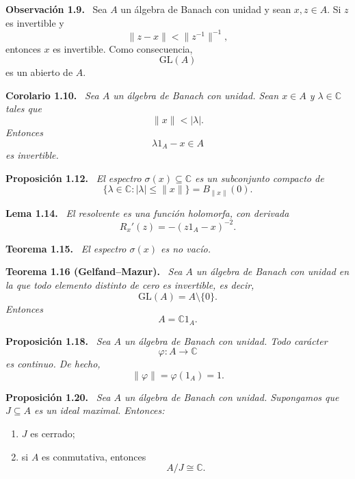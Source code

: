 \documentclass[11pt]{article}
\newcommand{\GL}{\mathrm{GL}}
\newenvironment{teorema}[1]
  {\par\medskip\noindent\textbf{Teorema #1.}\ \itshape}
  {\par\medskip}
\newenvironment{proposicion}[1]
  {\par\medskip\noindent\textbf{Proposición #1.}\ \itshape}
  {\par\medskip}
\newenvironment{corolario}[1]
  {\par\medskip\noindent\textbf{Corolario #1.}\ \itshape}
  {\par\medskip}
\newenvironment{lema}[1]
  {\par\medskip\noindent\textbf{Lema #1.}\ \itshape}
  {\par\medskip}
\newenvironment{observacion}[1]
  {\par\medskip\noindent\textbf{Observación #1.}\ }
  {\par\medskip}
\begin{document}
\begin{observacion}{1.9}
Sea $A$ un álgebra de Banach con unidad y sean $x,z\in A$. Si $z$ es invertible y
\[
  \lVert z-x\rVert<\lVert z^{-1}\rVert^{-1},
\]
entonces $x$ es invertible. Como consecuencia,
\[
  \GL(A)
\]
es un abierto de $A$.
\end{observacion}

\begin{corolario}{1.10}
Sea $A$ un álgebra de Banach con unidad. Sean $x\in A$ y $\lambda\in\mathbb{C}$ tales que
\[
  \lVert x\rVert<|\lambda|.
\]
Entonces
\[
  \lambda 1_A-x\in A
\]
es invertible.
\end{corolario}

\begin{proposicion}{1.12}
El espectro $\sigma(x)\subseteq\mathbb{C}$ es un subconjunto compacto de
\[
  \{\lambda\in\mathbb{C}:|\lambda|\leq\lVert x\rVert\}
  =B_{\lVert x\rVert}(0).
\]
\end{proposicion}

\begin{lema}{1.14}
El resolvente es una función holomorfa, con derivada
\[
  R_x'(z)=-(z1_A-x)^{-2}.
\]
\end{lema}

\begin{teorema}{1.15}
El espectro $\sigma(x)$ es no vacío.
\end{teorema}

\begin{teorema}{1.16 (Gelfand--Mazur)}
Sea $A$ un álgebra de Banach con unidad en la que todo elemento distinto de cero es invertible, es decir,
\[
  \GL(A)=A\setminus\{0\}.
\]
Entonces
\[
  A=\mathbb{C}1_A.
\]
\end{teorema}

\begin{proposicion}{1.18}
Sea $A$ un álgebra de Banach con unidad. Todo carácter
\[
  \varphi:A\to\mathbb{C}
\]
es continuo. De hecho,
\[
  \lVert\varphi\rVert=\varphi(1_A)=1.
\]
\end{proposicion}

\begin{proposicion}{1.20}
Sea $A$ un álgebra de Banach con unidad. Supongamos que $J\subseteq A$ es un ideal maximal. Entonces:
\begin{enumerate}[label=(\alph*),leftmargin=2.2em]
  \item $J$ es cerrado;
  \item si $A$ es conmutativa, entonces
  \[
    A/J\cong\mathbb{C}.
  \]
\end{enumerate}
\end{proposicion}
\end{document}
